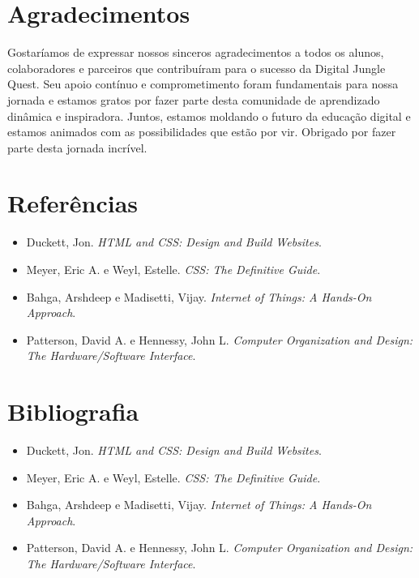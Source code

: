 \chapter*{Agradecimentos}
Gostaríamos de expressar nossos sinceros agradecimentos a todos os alunos, colaboradores e parceiros que contribuíram para o sucesso da Digital Jungle Quest. Seu apoio contínuo e comprometimento foram fundamentais para nossa jornada e estamos gratos por fazer parte desta comunidade de aprendizado dinâmica e inspiradora. Juntos, estamos moldando o futuro da educação digital e estamos animados com as possibilidades que estão por vir. Obrigado por fazer parte desta jornada incrível.
\chapter*{Referências}
\begin{itemize}
    \item Duckett, Jon. \textit{HTML and CSS: Design and Build Websites}.
    \item Meyer, Eric A. e Weyl, Estelle. \textit{CSS: The Definitive Guide}.
    \item Bahga, Arshdeep e Madisetti, Vijay. \textit{Internet of Things: A Hands-On Approach}.
    \item Patterson, David A. e Hennessy, John L. \textit{Computer Organization and Design: The Hardware/Software Interface}.
\end{itemize}

\chapter*{Bibliografia}
\begin{itemize}
    \item Duckett, Jon. \textit{HTML and CSS: Design and Build Websites}.
    \item Meyer, Eric A. e Weyl, Estelle. \textit{CSS: The Definitive Guide}.
    \item Bahga, Arshdeep e Madisetti, Vijay. \textit{Internet of Things: A Hands-On Approach}.
    \item Patterson, David A. e Hennessy, John L. \textit{Computer Organization and Design: The Hardware/Software Interface}.
\end{itemize}
